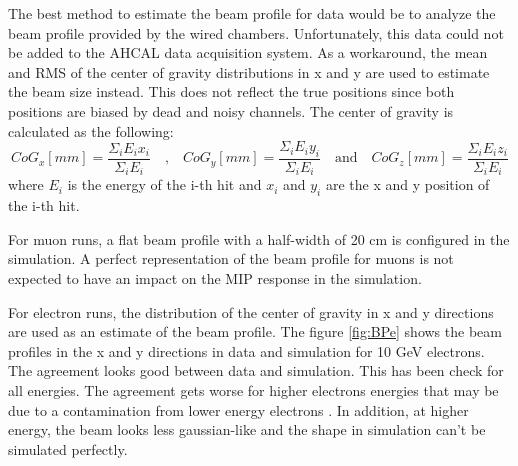 The best method to estimate the beam profile for data would be to analyze the beam profile provided by the wired chambers. Unfortunately, this data could not be added to the AHCAL data acquisition system. As a workaround, the mean and RMS of the center of gravity distributions in x and y are used to estimate the beam size instead. This does not reflect the true positions since both positions are biased by dead and noisy channels. The center of gravity is calculated as the following:
\begin{equation}
	CoG_x [mm] = \frac{\Sigma_i E_i x_i}{\Sigma_i E_i} \quad \text{,} \quad CoG_y [mm] = \frac{\Sigma_i E_i y_i}{\Sigma_i E_i} \quad \text{and} \quad CoG_z [mm] = \frac{\Sigma_i E_i z_i}{\Sigma_i E_i}
\end{equation}
where $E_i$ is the energy of the i-th hit and $x_i$ and $y_i$ are the x and y position of the i-th hit.

For muon runs, a flat beam profile with a half-width of 20 cm is configured in the simulation. A perfect representation of the beam profile for muons is not expected to have an impact on the MIP response in the simulation.

For electron runs, the distribution of the center of gravity in x and y directions are used as an estimate of the beam profile. The figure \ref{fig:BPe} shows the beam profiles in the x and y directions in data and simulation for 10 GeV electrons. The agreement looks good between data and simulation. This has been check for all energies. The agreement gets worse for higher electrons energies that may be due to a contamination from lower energy electrons \cite{AmbraEnergy}. In addition, at higher energy, the beam looks less gaussian-like and the shape in simulation can't be simulated perfectly.

